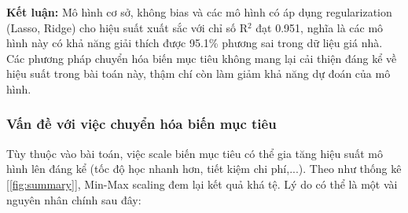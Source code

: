 \textbf{Kết luận:} Mô hình cơ sở, không bias và các mô hình có áp dụng regularization (Lasso, Ridge) cho hiệu suất xuất sắc với chỉ số R$^2$ đạt 0.951, nghĩa là các mô hình này có khả năng giải thích được 95.1\% phương sai trong dữ liệu giá nhà. Các phương pháp chuyển hóa biến mục tiêu không mang lại cải thiện đáng kể về hiệu suất trong bài toán này, thậm chí còn làm giảm khả năng dự đoán của mô hình.

\subsubsection{Vấn đề với việc chuyển hóa biến mục tiêu}
Tùy thuộc vào bài toán, việc scale biến mục tiêu có thể gia tăng hiệu suất mô hình lên đáng kể (tốc độ học nhanh hơn, tiết kiệm chi phí,...). Theo như thống kê [\ref{fig:summary}], Min-Max scaling đem lại kết quả khá tệ. Lý do có thể là một vài nguyên nhân chính sau đây:

